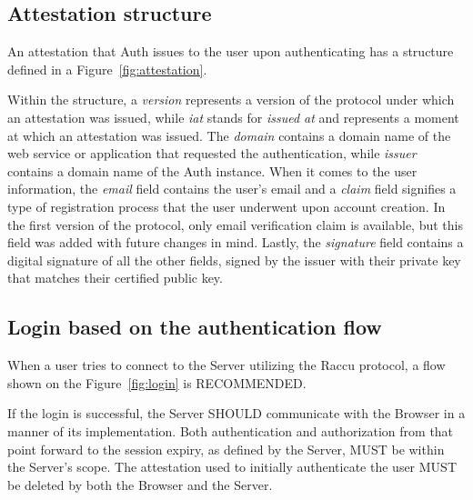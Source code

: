     \subsection{Attestation structure}
    An attestation that Auth issues to the user upon authenticating has a structure defined in a Figure~\ref{fig:attestation}.
    
    Within the structure, a \textit{version} represents a version of the protocol under which an attestation was issued, 
    while \textit{iat} stands for \textit{issued at} and represents a moment at which an attestation was issued. The 
    \textit{domain} contains a domain name of the web service or application that requested the authentication, while 
    \textit{issuer} contains a domain name of the Auth instance. When it comes to the user information, the \textit{email}
    field contains the user's email and a \textit{claim} field signifies a type of registration process that the user 
    underwent upon account creation. In the first version of the protocol, only email verification claim is available, but 
    this field was added with future changes in mind. Lastly, the \textit{signature} field contains a digital signature of 
    all the other fields, signed by the issuer with their private key that matches their certified public key. 

    \subsection{Login based on the authentication flow}
    When a user tries to connect to the Server utilizing the Raccu protocol, a flow shown on the Figure~\ref{fig:login} 
    is RECOMMENDED.
    
    If the login is successful, the Server SHOULD communicate with the Browser in a manner of its implementation. Both 
    authentication and authorization from that point forward to the session expiry, as defined by the Server, MUST be 
    within the Server's scope. The attestation used to initially authenticate the user MUST be deleted by both the Browser
    and the Server.       
